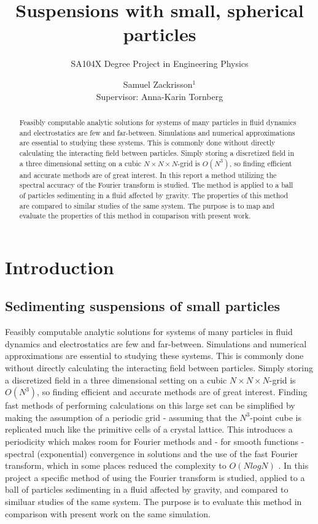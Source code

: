 \documentclass[a4paper,
twoside=false,abstract=false,numbers=noenddot,
titlepage=false,headings=small,parskip=half,version=last]{scrartcl}
\title{Suspensions with small, spherical particles}
\subtitle{SA104X Degree Project in Engineering Physics}
\author[2]{Samuel Zackrisson$^1$ \\ \footnotesize Supervisor: Anna-Karin Tornberg}
\affil[2]{Numerical Analysis, Royal Institute of Technology (KTH)}
\affil[1]{samuelz@kth.se}
\affil[2]{akto@kth.se}
\begin{document}
\maketitle
\thispagestyle{empty}

\begin{abstract}
Feasibly computable analytic solutions for systems of many particles in fluid dynamics and electrostatics are few and far-between.
Simulations and numerical approximations are essential to studying these systems.
This is commonly done without directly calculating the interacting field between particles.
Simply storing a discretized field in a three dimensional setting on a cubic $N\times N\times N$-grid is $O(N^3)$, so finding efficient and accurate methods are of great interest.
In this report a method utilizing the spectral accuracy of the Fourier transform is studied.
The method is applied to a ball of particles sedimenting in a fluid affected by gravity.
The properties of this method are compared to similar studies of the same system.
The purpose is to map and evaluate the properties of this method in comparison with present work.
\end{abstract}

\tableofcontents

\section{Introduction}
\subsection{Sedimenting suspensions of small particles}
Feasibly computable analytic solutions for systems of many particles in fluid dynamics and electrostatics are few and far-between.
Simulations and numerical approximations are essential to studying these systems.
This is commonly done without directly calculating the interacting field between particles.
Simply storing a discretized field in a three dimensional setting on a cubic $N\times N\times N$-grid is $O(N^3)$, so finding efficient and accurate methods are of great interest.
Finding fast methods of performing calculations on this large set can be simplified by making the assumption of a periodic grid - assuming that the $N^3$-point cube is replicated much like the primitive cells of a crystal lattice. This introduces a periodicity which makes room for Fourier methods and - for smooth functions - spectral (exponential) convergence in solutions and the use of the fast Fourier transform, which in some places reduced the complexity to $O(NlogN)$ \cite{fluctuatesediment}. In this project a specific method of using the Fourier transform is studied, applied to a ball of particles sedimenting in a fluid affected by gravity, and compared to similuar studies of the same system. The purpose is to evaluate this method in comparison with present work on the same simulation.
\end{document}
